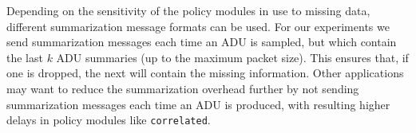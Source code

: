Depending on the sensitivity of the policy modules in use to missing data,
different summarization message formats can be used. For our experiments we
send summarization messages each time an ADU is sampled, but which contain
the last $k$ ADU summaries (up to the maximum packet size). This ensures
that, if one is dropped, the next will contain the missing information. Other
applications may want to reduce the summarization overhead further by not
sending summarization messages each time an ADU is produced, with resulting
higher delays in policy modules like \texttt{correlated}.
